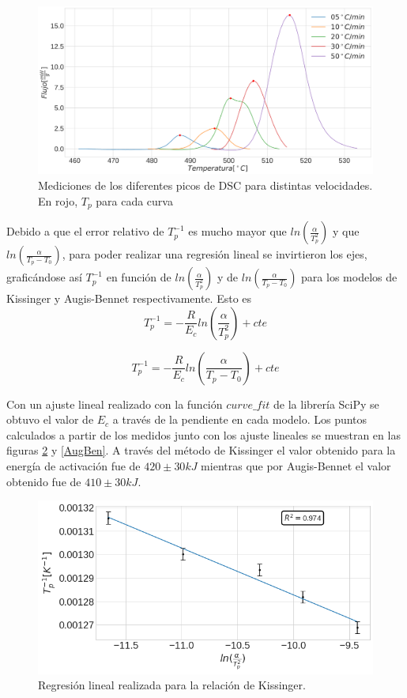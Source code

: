 \documentclass[12pt]{article}
\theoremstyle{definition}
\theoremstyle{remark}
\begin{document}
{\begin{figure}[H]
	\centering
	\includegraphics[scale=0.2]{img/DSCPeaks}
	\caption{Mediciones de los diferentes picos de DSC para distintas velocidades. En rojo, $T_p$ para cada curva}
	\label{DSCPeaks}
\end{figure}

Debido a que el error relativo de $T_p^{-1}$ es mucho mayor que $ln(\frac{\alpha}{T_p^2})$ y que $ln(\frac{\alpha}{T_p-T_0})$, para poder realizar una regresión lineal se invirtieron los ejes, graficándose así $T_p^{-1}$ en función de $ln(\frac{\alpha}{T_p^2})$ y de $ln(\frac{\alpha}{T_p-T_0})$ para los modelos de Kissinger y Augis-Bennet respectivamente. Esto es
\begin{equation}
	T_p^{-1}=-\frac{R}{E_c}ln(\frac{\alpha}{T_p^2})+cte
\end{equation}

\begin{equation}
	T_p^{-1}=-\frac{R}{E_c}ln(\frac{\alpha}{T_p-T_0})+cte
\end{equation}

Con un ajuste lineal realizado con la función $curve\_fit$ de la librería SciPy se obtuvo el valor de $E_c$ a través de la pendiente en cada modelo. Los puntos calculados a partir de los medidos junto con los ajuste lineales se muestran en las figuras \ref{Kiss} y \ref{AugBen}. A través del método de Kissinger el valor obtenido para la energía de activación fue de $420 \pm 30 kJ$ mientras que por Augis-Bennet el valor obtenido fue de $410 \pm 30 kJ$.


\begin{figure}[H]
 	\centering
	\includegraphics[scale=0.4]{img/Kissinger.png}
 	\caption{Regresión lineal realizada para la relación de Kissinger.}
	\label{Kiss}
\end{figure} 

}
\end{document}
